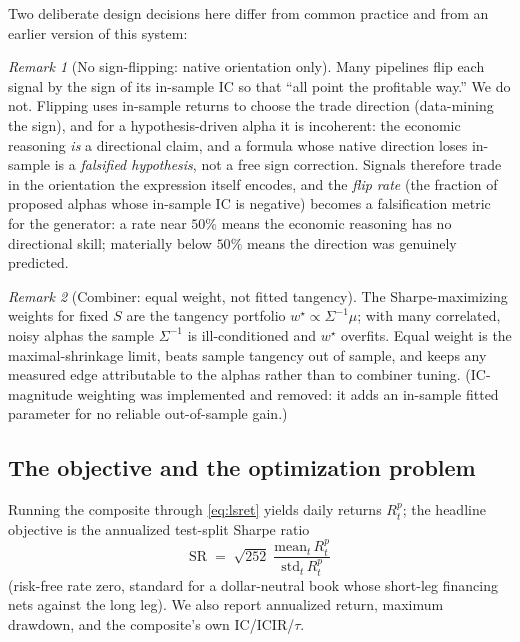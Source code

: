 \documentclass{article}
\theoremstyle{definition}
\theoremstyle{plain}
\theoremstyle{remark}
\newtheorem{remark}{Remark}[section]
\newcommand{\Sharpe}{\mathrm{SR}}
\begin{document}
Two deliberate design decisions here differ from common practice and from an earlier
version of this system:

\begin{remark}[No sign-flipping: native orientation only]
\label{rem:noflip}
Many pipelines flip each signal by the sign of its in-sample IC so that ``all point the
profitable way.'' We do not. Flipping uses in-sample returns to choose the trade
direction (data-mining the sign), and for a hypothesis-driven alpha it is
incoherent: the economic reasoning \emph{is} a directional claim, and a formula whose
native direction loses in-sample is a \emph{falsified hypothesis}, not a free sign
correction. Signals therefore trade in the orientation the expression itself encodes,
and the \emph{flip rate} (the fraction of proposed alphas whose in-sample IC is
negative) becomes a falsification metric for the generator: a rate near $50\%$ means
the economic reasoning has no directional skill; materially below $50\%$ means the
direction was genuinely predicted.
\end{remark}

\begin{remark}[Combiner: equal weight, not fitted tangency]
The Sharpe-maximizing weights for fixed $S$ are the tangency portfolio
$w^\star \propto \Sigma^{-1}\mu$; with many correlated, noisy alphas the sample
$\Sigma^{-1}$ is ill-conditioned and $w^\star$ overfits. Equal weight is the
maximal-shrinkage limit, beats sample tangency out of sample, and keeps any measured
edge attributable to the alphas rather than to combiner tuning. (IC-magnitude
weighting was implemented and removed: it adds an in-sample fitted parameter for no
reliable out-of-sample gain.)
\end{remark}

\subsection{The objective and the optimization problem}
\label{sec:opt}

Running the composite through \eqref{eq:lsret} yields daily returns $R^p_t$; the
headline objective is the annualized test-split Sharpe ratio
\begin{equation}
\boxed{\ \Sharpe \;=\; \sqrt{252}\;\frac{\mathrm{mean}_t\, R^p_t}{\mathrm{std}_t\, R^p_t}\ }
\label{eq:sharpe}
\end{equation}
(risk-free rate zero, standard for a dollar-neutral book whose short-leg financing nets
against the long leg). We also report annualized return, maximum drawdown, and the
composite's own IC/ICIR/$\tau$.
\end{document}
